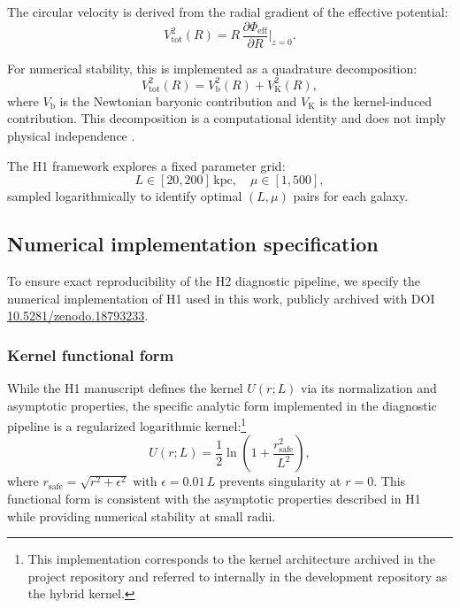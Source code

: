 \documentclass{aa}
\begin{document}
The circular velocity is derived from the radial gradient of the effective potential:
\begin{equation}
	V^2_{\mathrm{tot}}(R) = R\, \frac{\partial \Phi_{\mathrm{eff}}}{\partial R}\Bigg|_{z=0}.
	\label{eq:v_gradient}
\end{equation}

For numerical stability, this is implemented as a quadrature decomposition:
\begin{equation}
	V^2_{\mathrm{tot}}(R) = V^2_{\mathrm{b}}(R) + V^2_{\mathrm{K}}(R),
	\label{eq:v_quadrature}
\end{equation}
where $V_{\mathrm{b}}$ is the Newtonian baryonic contribution and $V_{\mathrm{K}}$ is the kernel-induced contribution. This decomposition is a computational identity and does not imply physical independence \citep{figueiredo2024_h1}.

The H1 framework explores a fixed parameter grid:
\begin{equation}
	L \in [20, 200]\,\mathrm{kpc}, \quad \mu \in [1, 500],
	\label{eq:param_grid}
\end{equation}
sampled logarithmically to identify optimal $(L, \mu)$ pairs for each galaxy.

\subsection{Numerical implementation specification}

To ensure exact reproducibility of the H2 diagnostic pipeline, we specify the numerical implementation of H1 used in this work, publicly archived with DOI \href{https://doi.org/10.5281/zenodo.18793233}{10.5281/zenodo.18793233}.

\subsubsection{Kernel functional form}

While the H1 manuscript defines the kernel $U(r;L)$ via its normalization and asymptotic properties, the specific analytic form implemented in the diagnostic pipeline is a regularized logarithmic kernel:\footnote{This implementation corresponds to the kernel architecture archived in the project repository and referred to internally in the development repository as the hybrid kernel.}
\begin{equation}
	U(r; L) = \frac{1}{2} \ln\left(1 + \frac{r^2_{\mathrm{safe}}}{L^2}\right),
	\label{eq:kernel_implementation}
\end{equation}
where $r_{\mathrm{safe}} = \sqrt{r^2 + \epsilon^2}$ with $\epsilon = 0.01\,L$ prevents singularity at $r = 0$. This functional form is consistent with the asymptotic properties described in H1 while providing numerical stability at small radii.
\end{document}
